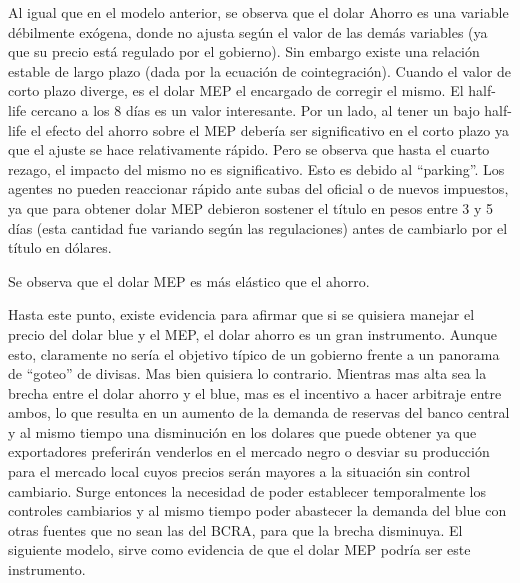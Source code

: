 \documentclass[11pt,a4paper]{article}
\begin{document}
Al igual que en el modelo anterior, se observa que el dolar Ahorro es una variable débilmente exógena, donde no ajusta según el valor de las demás variables (ya que su precio está regulado por el gobierno). Sin embargo existe una relación estable de largo plazo (dada por la ecuación de cointegración). Cuando el valor de corto plazo diverge, es el dolar MEP el encargado de corregir el mismo. El half-life cercano a los 8 días es un valor interesante. Por un lado, al tener un bajo half-life el efecto del ahorro sobre el MEP debería ser significativo en el corto plazo ya que el ajuste se hace relativamente rápido. Pero se observa que hasta el cuarto rezago, el impacto del mismo no es significativo. Esto es debido al ``parking''. Los agentes no pueden reaccionar rápido ante subas del oficial o de nuevos impuestos, ya que para obtener dolar MEP debieron sostener el título en pesos entre 3 y 5 días (esta cantidad fue variando según las regulaciones) antes de cambiarlo por el título en dólares.


\begin{table}[H]
\centering
{}
\caption{Estimación de la ecuación de cointegración entre los dolares ahorro y MEP}
\end{table}

Se observa que el dolar MEP es más elástico que el ahorro.

Hasta este punto, existe evidencia para afirmar que si se quisiera manejar el precio del dolar blue y el MEP, el dolar ahorro es un gran instrumento. Aunque esto, claramente no sería el objetivo típico de un gobierno frente a un panorama de ``goteo'' de divisas. Mas bien quisiera lo contrario. Mientras mas alta sea la brecha entre el dolar ahorro y el blue, mas es el incentivo a hacer arbitraje entre ambos, lo que resulta en un aumento de la demanda de reservas del banco central y al mismo tiempo una disminución en los dolares que puede obtener ya que exportadores preferirán venderlos en el mercado negro o desviar su producción para el mercado local cuyos precios serán mayores a la situación sin control cambiario. Surge entonces la necesidad de poder establecer temporalmente los controles cambiarios y al mismo tiempo poder abastecer la demanda del blue con otras fuentes que no sean las del BCRA, para que la brecha disminuya. El siguiente modelo, sirve como evidencia de que el dolar MEP podría ser este instrumento. 
\end{document}
